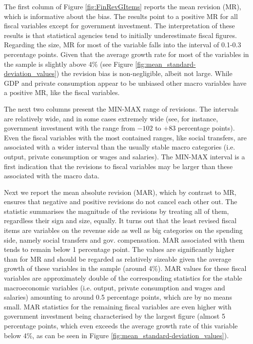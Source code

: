 The first column of Figure \ref{fig:FinRevGItems} reports the mean
revision (MR), which is informative about the bias. The results point
to a positive MR for all fiscal variables except for government investment.
The interpretation of these results is that statistical agencies tend
to initially underestimate fiscal figures. Regarding the size, MR
for most of the variable falls into the interval of 0.1-0.3 percentage
points. Given that the average growth rate for most of the variables
in the sample is slightly above 4\% (see Figure \ref{fig:mean_standard-deviation_values})
the revision bias is non-negligible, albeit not large. 
While GDP and private consumption appear to be unbiased other macro
variables have a positive MR, like the fiscal
variables.

The next two columns present the MIN-MAX range of revisions. The intervals are relatively wide, 
and in some cases extremely wide (see, for instance, government investment with the range from $-102$ to $+83$ percentage points). Even the fiscal variables with the most contained ranges, like social transfers, are associated
with a wider interval than the usually stable macro categories (i.e.
output, private consumption or wages and salaries). The MIN-MAX interval is a
first indication that the revisions to fiscal variables may be larger than
these associated with the macro data.

Next we report the mean absolute revision (MAR), which by contrast
to MR, ensures that negative and positive revisions do not cancel
each other out. The statistic summarises the magnitude of the revisions
by treating all of them, regardless their sign and size, equally.
It turns out that the least revised fiscal items are variables on
the revenue side as well as big categories on the spending side, namely
social transfers and gov. compensation. MAR associated with
them tends to remain below 1 percentage point. The values are significantly
higher than for MR and should be regarded as relatively sizeable
given the average growth of these variables in the sample (around 4\%). MAR values for these fiscal variables are approximately
double of the corresponding statistics for the stable macroeconomic
variables (i.e. output, private consumption and wages and salaries) amounting to
around 0.5 percentage points, which are by no means small. MAR statistics
for the remaining fiscal variables are even higher with government
investment being characterised by the largest figure (almost 5 percentage
points, which even exceeds the average growth rate of this variable below 4\%, as can be seen in Figure \ref{fig:mean_standard-deviation_values}).

